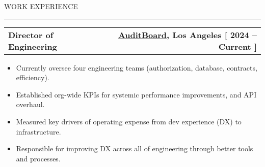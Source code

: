 \documentclass[12pt]{article}
\makeatletter
\newenvironment{justifycolumns}
{\begin{tabular*}{\textwidth}{@{\extracolsep{\fill}} lr@{}}}
{\end{tabular*}}
\newcommand{\row}[2]{#1 & #2 \\}
\newcommand{\rowheading}[2]{\row{\textbf{#1}}{\textbf{#2}}}
\newcommand{\range}[2]{#1 -- #2}
\newcommand{\blockseparation}{\vspace{0.13in}}
\newcommand{\heading}[1]{
	\vspace{0.05in}
	\uppercase{#1}
	\vspace{0.05in}
	\hrule
	\blockseparation
}
\newenvironment{tightbullets}
{\begin{itemize}}
{\end{itemize}}
\newenvironment{bullets}
{\begin{tightbullets}}
{\end{tightbullets} \blockseparation}
\makeatother
\begin{document}
\begin{flushleft}
\pagebreak

\heading{Work Experience}
\vspace{0.05in}

\hspace{0.2in}
\begin{justifycolumns}
	\hspace{0.1in}
	\rowheading{Director of Engineering}{\textnormal{\href{https://auditboard.com}{AuditBoard}, Los Angeles [ \range{2024}{Current} ]}}
\end{justifycolumns}
\begin{bullets}
	\item Currently oversee four engineering teams (authorization, database, contracts, efficiency).
	\item Established org-wide KPIs for systemic performance improvements, and API overhaul.
	\item Measured key drivers of operating expense from dev experience (DX) to infrastructure.
	\item Responsible for improving DX across all of engineering through better tools and processes.
\end{bullets}
\vspace{0.05in}


\end{flushleft}
\end{document}
